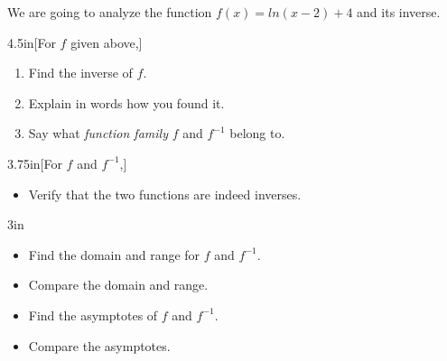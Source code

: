 We are going to analyze the function 
{
    \large
    \( f(x) = ln(x-2) + 4\)
}
and its inverse.

\begin{myWideProblem}{4.5in}[For $f$ given above,]
    {
        \begin{enumerate}[nosep]
            \item Find the inverse of $f$.
            \item Explain in words how you found it.
            \item Say what {\itshape function family} $f$ and $f^{-1}$ belong to.
        \end{enumerate}
    }
\end{myWideProblem}

\begin{myWideProblem}{3.75in}[For $f$ and $f^{-1}$,]
    {
        \begin{itemize}[nosep]
            \item Verify that the two functions are indeed inverses.
        \end{itemize}
    }
\end{myWideProblem}

\begin{my2Problems}{3in}
    {
        \begin{itemize}[noitemsep,left=-0.75em]
            \item Find the domain and range for $f$ and $f^{-1}$.
            \item Compare the domain and range.
        \end{itemize}
    }
    {
        \begin{itemize}[noitemsep,left=-0.75em]
            \item Find the asymptotes of $f$ and $f^{-1}$.
            \item Compare the asymptotes.
        \end{itemize}
    }
\end{my2Problems}

